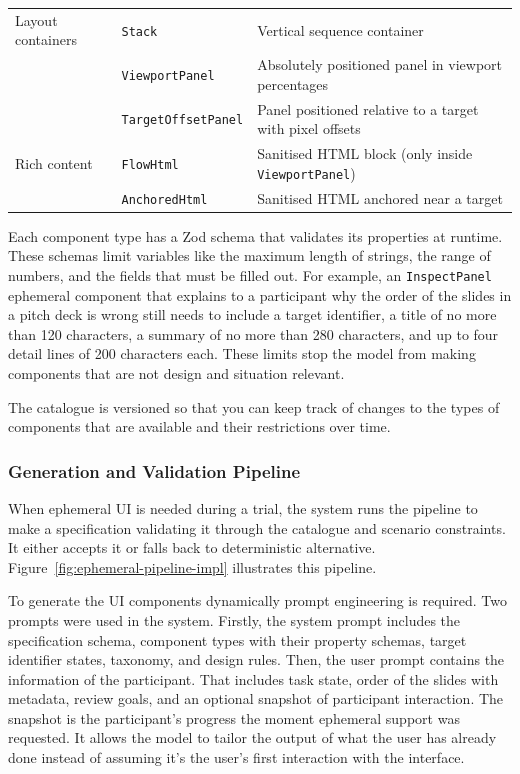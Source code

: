 \begin{table}[t]
\begin{tabular}{@{}p{}p{}p{}@{}}
        \midrule
        Layout containers & \texttt{Stack} & Vertical sequence container \\
        & \texttt{ViewportPanel} & Absolutely positioned panel in viewport percentages \\
        & \texttt{TargetOffsetPanel} & Panel positioned relative to a target with pixel offsets \\
        \midrule
        Rich content & \texttt{FlowHtml} & Sanitised HTML block (only inside \texttt{ViewportPanel}) \\
        & \texttt{AnchoredHtml} & Sanitised HTML anchored near a target \\
        \bottomrule
    \end{tabular}
\end{table}

Each component type has a Zod schema that validates its properties at runtime. These schemas limit variables like the maximum length of strings, the range of numbers, and the fields that must be filled out. For example, an \texttt{InspectPanel} ephemeral component that explains to a participant why the order of the slides in a pitch deck is wrong still needs to include a target identifier, a title of no more than 120 characters, a summary of no more than 280 characters, and up to four detail lines of 200 characters each. These limits stop the model from making components that are not design and situation relevant.

The catalogue is versioned so that you can keep track of changes to the types of components that are available and their restrictions over time.

\subsubsection{Generation and Validation Pipeline}\label{sec:pipeline}

When ephemeral UI is needed during a trial, the system runs the pipeline to make a specification validating it through the catalogue and scenario constraints. It either accepts it or falls back to deterministic alternative. Figure~\ref{fig:ephemeral-pipeline-impl} illustrates this pipeline.

To generate the UI components dynamically prompt engineering is required. Two prompts were used in the system. Firstly, the system prompt includes the specification schema, component types with their property schemas, target identifier states, taxonomy, and design rules. Then, the user prompt contains the information of the participant. That includes task state, order of the slides with metadata, review goals, and an optional snapshot of participant interaction. The snapshot is the participant's progress the moment ephemeral support was requested. It allows the model to tailor the output of what the user has already done instead of assuming it's the user's first interaction with the interface.


